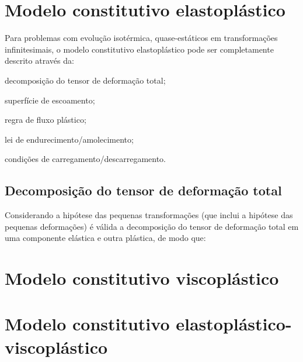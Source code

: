 \section{Modelo constitutivo elastoplástico}

Para problemas com evolução isotérmica, quase-estáticos em transformações infinitesimais, o modelo constitutivo elastoplástico pode ser completamente descrito através da:
\begin{alineas}
	\item decomposição do tensor de deformação total;
	\item superfície de escoamento;
	\item regra de fluxo plástico;
	\item lei de endurecimento/amolecimento;
	\item condições de carregamento/descarregamento.
\end{alineas}

\subsection{Decomposição do tensor de deformação total}
Considerando a hipótese das pequenas transformações (que inclui a hipótese das pequenas deformações) é válida a decomposição do tensor de deformação total em uma componente elástica e outra plástica, de modo que:
\begin{equation}
	\label{eq:decomposicao_deformacoes}
\end{equation}


\section{Modelo constitutivo viscoplástico}


\section{Modelo constitutivo elastoplástico-viscoplástico}







